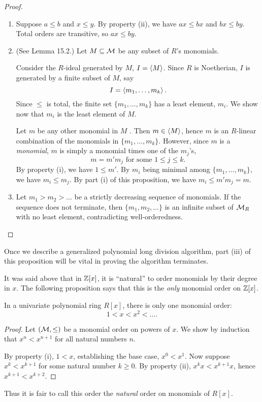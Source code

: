 \begin{proof}
  \begin{enumerate}[label=(\roman*)]
    \item
      Suppose $a \leq b$ and $x \leq y$.
      By property (ii), we have $ax \leq bx$ and $bx \leq by$.
      Total orders are transitive, so $ax \leq by$.
    
    \item
      (See \cite{eisenbud95} Lemma 15.2.)
      Let $M \subseteq \cal M$ be any subset of $R$'s monomials.
      
      Consider the $R$-ideal generated by $M$, $I = \pid M$.
      Since $R$ is Noetherian, $I$ is generated by a finite subset of $M$, say
        \[ I = \pid{m_1, \ldots, m_k}. \]
      Since $\leq$ is total, the finite set $\{ m_1, \ldots, m_k \}$ has a least element, $m_i$.
      We show now that $m_i$ is the least element of $M$.
      
      Let $m$ be any other monomial in $M$ .
      Then $m \in \pid{M}$, hence $m$ is an $R$-linear combination of the monomials in $\{ m_1, \ldots, m_k \}$.
      However, since $m$ is a \emph{monomial}, $m$ is simply a monomial times one of the $m_j$'s,
        \[ m = m'm_j \text{ for some }1 \leq j \leq k. \]
      By property (i), we have $1 \leq m'$.
      By $m_i$ being minimal among $\{ m_1, \ldots, m_k \}$, we have $m_i \leq m_j$.
      By part (i) of this proposition, we have $m_i \leq m'm_j = m$.
    
    \item
      Let $m_1 > m_2 > \dots$ be a strictly decreasing sequence of monomials.
      If the sequence does not terminate, then $\{m_1, m_2, \ldots\}$ is an infinite subset of $\cal M_R$ with no least element,
      contradicting well-orderedness.
  \end{enumerate}
\end{proof}
Once we describe a generalized polynomial long division algorithm,
part (iii) of this proposition will be vital in proving the algorithm terminates.

It was said above that in $\bb Z[x]$, it is ``natural'' to order monomials by their degree in $x$.
The following proposition says that this is the \emph{only} monomial order on $\bb Z[x]$.
\begin{proposition}
  In a univariate polynomial ring $R[x]$,
  there is only one monomial order:
  \[ 1 < x < x^2 < \dots. \]
\end{proposition}
\begin{proof}
  Let $(\cal M, \leq)$ be a monomial order on powers of $x$.
  We show by induction that $x^n < x^{n+1}$ for all natural numbers $n$.

  By property (i), $1 < x$, establishing the base case, $x^0 < x^1$.
  Now suppose $x^k < x^{k+1}$ for some natural number $k \geq 0$.
  By property (ii), $x^kx < x^{k+1}x$, hence $x^{k+1} < x^{k+2}$.
\end{proof}
Thus it is fair to call this order the \emph{natural} order on monomials of $R[x]$.

